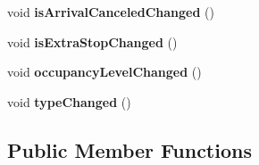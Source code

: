\begin{DoxyCompactItemize}
void {\bfseries is\+Arrival\+Canceled\+Changed} ()
\item 
\mbox{\label{classVehicleEngine_1_1Stop_a4c48ce2e195fd78cf0143eb39622633e}} 
void {\bfseries is\+Extra\+Stop\+Changed} ()
\item 
\mbox{\label{classVehicleEngine_1_1Stop_a5cd6e6ecc6c6d88ead8e7a89afd9c684}} 
void {\bfseries occupancy\+Level\+Changed} ()
\item 
\mbox{\label{classVehicleEngine_1_1Stop_a0d6575b465d76e8bbabd125683111e1a}} 
void {\bfseries type\+Changed} ()
\end{DoxyCompactItemize}
\subsection*{Public Member Functions}
